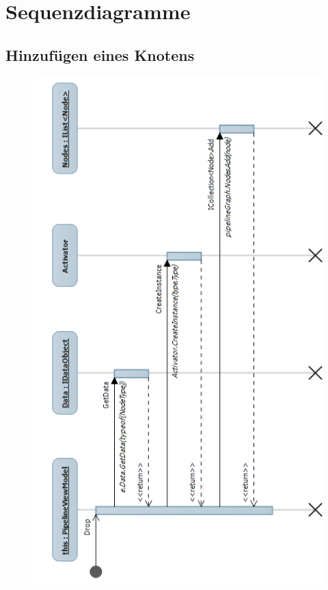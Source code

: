\section{Sequenzdiagramme}

\subsection{Hinzufügen eines Knotens}
\begin{figure}[h!]
\begin{center}
\includegraphics[height=0.7\textheight]{Diagrams/drop.png}
\end{center}
\end{figure}
\newpage

